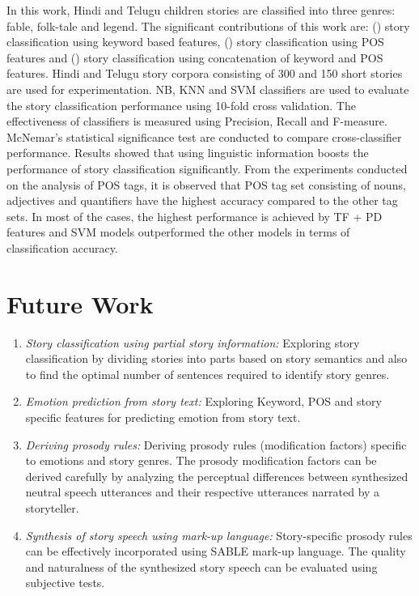 \documentclass[times, 11pt, a4paper]{article}
\begin{document}
In this work, Hindi and Telugu children stories are classified into three genres: fable, folk-tale and legend. The significant contributions of this work are: () story classification using keyword based features, () story classification using POS features and () story classification using concatenation of keyword and POS features. Hindi and Telugu story corpora consisting of 300 and 150 short stories are used for experimentation. NB, KNN and SVM classifiers are used to evaluate the story classification performance using 10-fold cross validation. The effectiveness of classifiers is measured using Precision, Recall and F-measure. McNemar's statistical significance test are conducted to compare cross-classifier performance. Results showed that using linguistic information boosts the performance of story classification significantly. From the experiments conducted on the analysis of POS tags, it is observed that POS tag set consisting of nouns, adjectives and quantifiers have the highest accuracy compared to the other tag sets. In most of the cases, the highest performance is achieved by TF + PD features and SVM models outperformed the other models in terms of classification accuracy. 



\section{Future Work}

\begin{enumerate}
\item \textit{Story classification using partial story information:} Exploring story classification by dividing stories into parts based on story semantics and also to find the optimal number of sentences required to identify story genres.
\item \textit{Emotion prediction from story text:} Exploring Keyword, POS and story specific features for predicting emotion from story text. \\ 
\item \textit{Deriving prosody rules:} Deriving prosody rules (modification factors) specific to emotions and story genres. The prosody modification factors can be derived carefully by analyzing the perceptual differences between synthesized neutral speech utterances and their respective utterances narrated by a storyteller. 
\item \textit{Synthesis of story speech using mark-up language:} Story-specific prosody rules can be effectively incorporated using SABLE mark-up language. The quality and naturalness of the synthesized story speech can be evaluated using subjective tests.
\end{enumerate}
\end{document}
